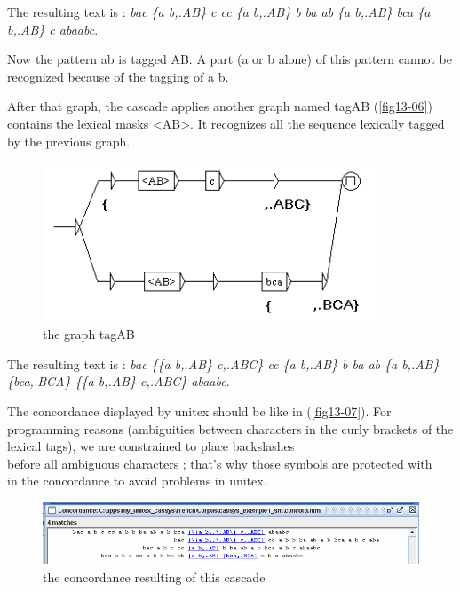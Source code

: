 \bigskip
\noindent The resulting text is : \emph{bac \{a b,.AB\} c cc \{a b,.AB\} b ba ab \{a b,.AB\} bca \{a b,.AB\} c abaabc}.

\bigskip
\noindent Now the pattern ab is tagged AB. A part (a or b alone) of this pattern cannot be recognized because of the tagging of a b. 

\bigskip
\noindent After that graph, the cascade applies another graph named tagAB (\ref{fig13-06}) contains the lexical masks <AB>. It recognizes all the sequence lexically tagged by the previous graph.

\begin{figure}[!htb]
  \centering
  \includegraphics[width=10cm]{resources/img/fig13-06.png}
  \caption{the graph tagAB}
  \label{fig:fig13-06}
\end{figure}

\bigskip
\noindent The resulting text is : \emph{bac \{\{a b,.AB\} c,.ABC\} cc \{a b,.AB\} b ba ab \{a b,.AB\} \{bca,.BCA\} \{\{a b,.AB\} c,.ABC\} abaabc}.


\bigskip
\noindent The concordance displayed by unitex should be like in (\ref{fig13-07}). For programming reasons (ambiguities between characters in the curly brackets of the lexical tags), we are constrained to place backslashes \\ before all ambiguous characters ; that's why those symbols are protected with \\ in the concordance to avoid problems in unitex. 

\begin{figure}[!htb]
  \centering
  \includegraphics[width=12cm]{resources/img/fig13-07.png}
  \caption{the concordance resulting of this cascade}
  \label{fig:fig13-07}
\end{figure}

